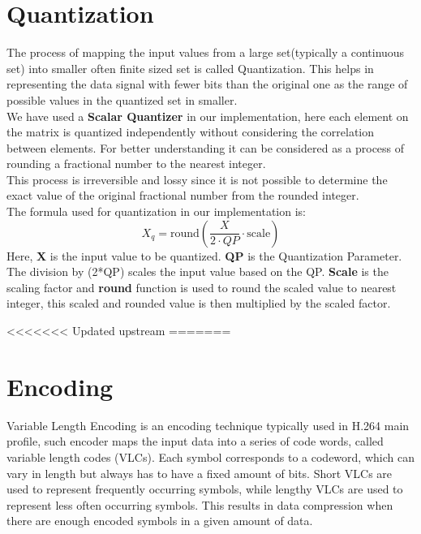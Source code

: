 \section{Quantization}
The process of mapping the input values from a large set(typically a continuous set) into smaller often finite sized set is called Quantization. This helps in representing the data signal with fewer bits than the original one as the range of possible values in the quantized set in smaller.\\
We have used a \textbf{Scalar Quantizer} in our implementation, here each element on the matrix is quantized independently without considering the correlation between elements. For better understanding it can be considered as a process of rounding a fractional number to the nearest integer.\\
This process is irreversible and lossy since it is not possible to determine the exact value of the original fractional number from the rounded integer.\\
The formula used for quantization in our implementation is:
\[
X_q = \text{round}\left(\frac{X}{{2 \cdot QP}} \cdot \text{scale}\right)
\]
Here, \textbf{X} is the input value to be quantized. \textbf{QP} is the Quantization Parameter. The division by (2*QP) scales the input value based on the QP. \textbf{Scale} is the scaling factor and \textbf{round} function is used to round the scaled value to nearest integer, this scaled and rounded value is then multiplied by the scaled factor.

<<<<<<< Updated upstream
=======
\section{Encoding}
Variable Length Encoding is an encoding technique typically used in H.264 main profile, such encoder maps the input data into a series of code words, called variable length codes (VLCs). Each symbol corresponds to a codeword, which can vary in length but always has to have a fixed amount of bits. Short VLCs are used to represent frequently occurring symbols, while lengthy VLCs are used to represent less often occurring symbols. This results in data compression when there are enough encoded symbols in a given amount of data.

